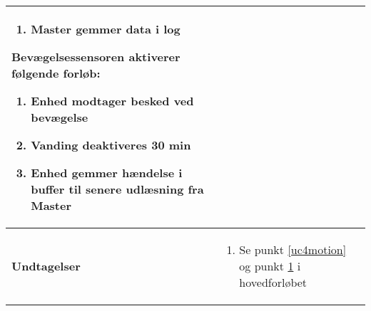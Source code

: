 \begin{center}
\begin{longtable}{|p{5cm}|p{9cm}|}
\begin{enumerate}[resume]
				\item Master gemmer data i log
			\end{enumerate}
			
			
			 Bevægelsessensoren aktiverer følgende forløb:
			\begin{enumerate}[resume]
			
				\item \label{uc4motion} Enhed modtager besked ved bevægelse 
				
				\item \label{uc4deactivate} Vanding deaktiveres 30 min	
				
				\item Enhed gemmer hændelse i buffer til senere udlæsning fra Master 
				
			\end{enumerate}\\\hline

		\textbf{Undtagelser}
			&\begin{enumerate}[label=\ref{uc4vandstart}.a.]
			
				\item Se punkt \ref{uc4motion} og punkt \ref{uc4deactivate} i hovedforløbet	
			
			\end{enumerate}\\\hline
			
	\end{longtable}
\end{center}

